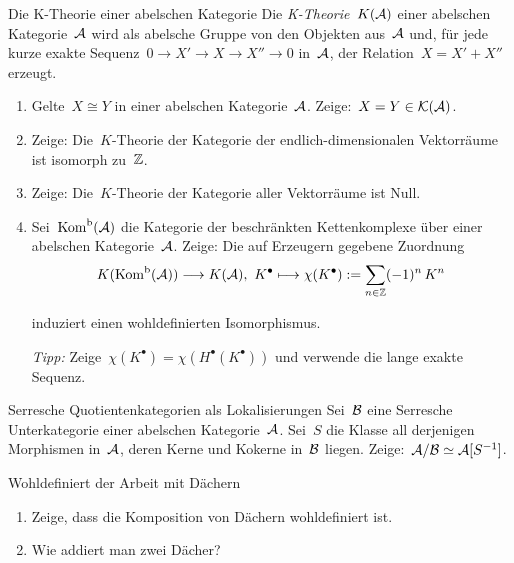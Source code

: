 \documentclass{uebblatt}
\begin{document}
\begin{aufgabe}{Die K-Theorie einer abelschen Kategorie}
Die \emph{K-Theorie}~$K(\mathcal{A})$ einer abelschen Kategorie~$\mathcal{A}$ wird als abelsche
Gruppe von den Objekten aus~$\mathcal{A}$ und, für jede kurze exakte
Sequenz~$0 \to X' \to X \to X'' \to 0$ in~$\mathcal{A}$, der Relation~$X = X' + X''$ erzeugt.

\begin{enumerate}
\item Gelte~$X \cong Y$ in einer abelschen Kategorie~$\mathcal{A}$. Zeige:~$X = Y \in \mathcal{K}(\mathcal{A})$.
\item Zeige: Die~$K$-Theorie der Kategorie der endlich-dimensionalen Vektorräume
ist isomorph zu~$\mathbb{Z}$.
\item Zeige: Die~$K$-Theorie der Kategorie aller Vektorräume ist Null.
\item Sei~$\mathrm{Kom}^\mathrm{b}(\mathcal{A})$ die Kategorie der beschränkten Kettenkomplexe über einer
abelschen Kategorie~$\mathcal{A}$. Zeige: Die auf Erzeugern gegebene Zuordnung
\[ K(\mathrm{Kom}^\mathrm{b}(\mathcal{A})) \longrightarrow K(\mathcal{A}),\ K^\bullet \longmapsto
  \chi(K^\bullet) := \sum_{n \in \mathbb{Z}} (-1)^n \, K^n \]
\vspace{-1.5em}

induziert einen wohldefinierten Isomorphismus.

\emph{Tipp:} Zeige~$\chi(K^\bullet) = \chi(H^\bullet(K^\bullet))$ und verwende
die lange exakte Sequenz.
\end{enumerate}
\end{aufgabe}

\begin{aufgabe}{Serresche Quotientenkategorien als Lokalisierungen}
Sei~$\mathcal{B}$ eine Serresche Unterkategorie einer abelschen Kategorie~$\mathcal{A}$. Sei~$S$
die Klasse all derjenigen Morphismen in~$\mathcal{A}$, deren Kerne und Kokerne in~$\mathcal{B}$
liegen. Zeige:~$\mathcal{A}/\mathcal{B} \simeq \mathcal{A}[S^{-1}]$.
\end{aufgabe}
\vspace{-1em}

\begin{aufgabe}{Wohldefiniert der Arbeit mit Dächern}
\begin{enumerate}
\item Zeige, dass die Komposition von Dächern wohldefiniert ist.
\item Wie addiert man zwei Dächer?
\end{enumerate}
\end{aufgabe}
\end{document}
